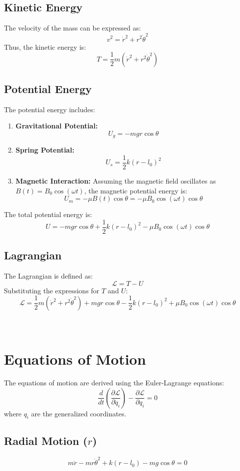 \documentclass[12pt]{article}
\begin{document}
\subsection{Kinetic Energy}
The velocity of the mass can be expressed as:
\[
v^2 = \dot{r}^2 + r^2\dot{\theta}^2
\]
Thus, the kinetic energy is:
\[
T = \frac{1}{2}m\left( \dot{r}^2 + r^2\dot{\theta}^2 \right)
\]

\subsection{Potential Energy}
The potential energy includes:
\begin{enumerate}
    \item \textbf{Gravitational Potential:}
    \[
    U_g = -mgr\cos\theta
    \]
    \item \textbf{Spring Potential:}
    \[
    U_s = \frac{1}{2}k(r - l_0)^2
    \]
    \item \textbf{Magnetic Interaction:}
    Assuming the magnetic field oscillates as \( B(t) = B_0\cos(\omega t) \), the magnetic potential energy is:
    \[
    U_m = -\mu B(t)\cos\theta = -\mu B_0\cos(\omega t)\cos\theta
    \]
\end{enumerate}

The total potential energy is:
\[
U = -mgr\cos\theta + \frac{1}{2}k(r - l_0)^2 - \mu B_0\cos(\omega t)\cos\theta
\]

\subsection{Lagrangian}
The Lagrangian is defined as:
\[
\mathcal{L} = T - U
\]
Substituting the expressions for \( T \) and \( U \):
\[
\mathcal{L} = \frac{1}{2}m\left( \dot{r}^2 + r^2\dot{\theta}^2 \right) + mgr\cos\theta - \frac{1}{2}k(r - l_0)^2 + \mu B_0\cos(\omega t)\cos\theta
\]
\\\\
\section{Equations of Motion}
The equations of motion are derived using the Euler-Lagrange equations:
\[
\frac{d}{dt}\left(\frac{\partial \mathcal{L}}{\partial \dot{q}_i}\right) - \frac{\partial \mathcal{L}}{\partial q_i} = 0
\]
where \( q_i \) are the generalized coordinates.

\subsection{Radial Motion (\( r \))}
\[
m\ddot{r} - mr\dot{\theta}^2 + k(r - l_0) - mg\cos\theta = 0
\]
\end{document}
